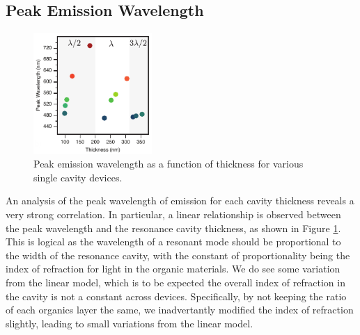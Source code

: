 \documentclass{report}
\begin{document}

    
        \subsection{Peak Emission Wavelength} \label{peakWavelength}
            \begin{figure}
                \centering
                \vspace{-1cm}
                \includegraphics[width=0.4\textwidth]{images/n1_peak_emission.png}
                \caption{\small Peak emission wavelength as a function of thickness for various single cavity devices.}
                \label{fig:peak_emission}
            \end{figure}

            An analysis of the peak wavelength of emission for each cavity thickness reveals a very strong correlation. In particular, a linear relationship is observed between the peak wavelength and the resonance cavity thickness, as shown in Figure \ref{fig:peak_emission}. This is logical as the wavelength of a resonant mode should be proportional to the width of the resonance cavity, with the constant of proportionality being the index of refraction for light in the organic materials. We do see some variation from the linear model, which is to be expected the overall index of refraction in the cavity is not a constant across devices. Specifically, by not keeping the ratio of each organics layer the same, we inadvertantly modified the index of refraction slightly, leading to small variations from the linear model.
            
\end{document}
